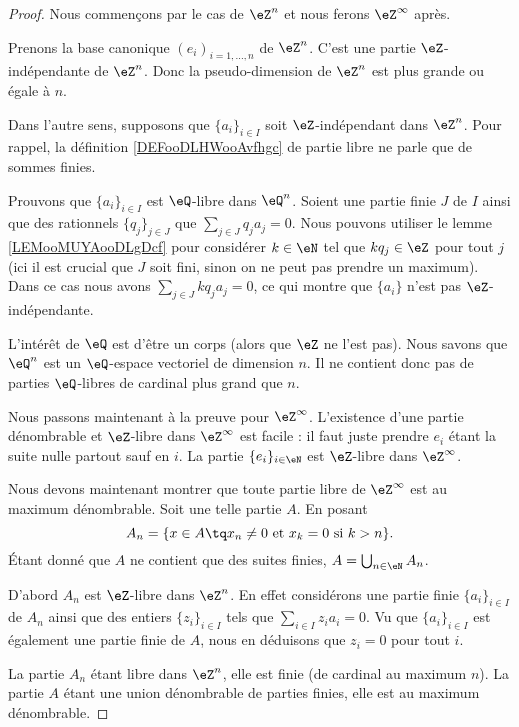 \begin{proof}
	Nous commençons par le cas de \( \eZ^n\) et nous ferons \( \eZ^{\infty}\) après.
	\begin{subproof}
		\spitem[\( \geq n\)]
		Prenons la base canonique \( (e_i)_{i=1,\ldots,n}\) de \( \eZ^n\). C'est une partie \( \eZ\)-indépendante de \( \eZ^n\). Donc la pseudo-dimension de \( \eZ^n\) est plus grande ou égale à \( n\).

		\spitem[\( \leq n\)]
		Dans l'autre sens, supposons que \( \{ a_i \}_{i\in I}\) soit \( \eZ\)-indépendant dans \( \eZ^n\). Pour rappel, la définition \ref{DEFooDLHWooAvfhgc} de partie libre ne parle que de sommes finies.

		Prouvons que \( \{ a_i \}_{i\in I} \) est \( \eQ\)-libre dans \( \eQ^n\). Soient une partie finie \( J\) de \( I\) ainsi que des rationnels \( \{ q_j \}_{j\in J}\) que \( \sum_{j\in J}q_ja_j=0\). Nous pouvons utiliser le lemme \ref{LEMooMUYAooDLgDcf} pour considérer \( k\in \eN\) tel que \( kq_j\in \eZ\) pour tout \( j\) (ici il est crucial que \( J\) soit fini, sinon on ne peut pas prendre un maximum). Dans ce cas nous avons \( \sum_{j\in J}kq_ja_j=0\), ce qui montre que \( \{ a_i \}\) n'est pas \( \eZ\)-indépendante.

		L'intérêt de \( \eQ\) est d'être un corps (alors que \( \eZ\) ne l'est pas). Nous savons que \( \eQ^n\) est un \( \eQ\)-espace vectoriel de dimension \( n\). Il ne contient donc pas de parties \( \eQ\)-libres de cardinal plus grand que \( n\).
	\end{subproof}

	Nous passons maintenant à la preuve pour \( \eZ^{\infty}\)\cite{MonCerveau}. L'existence d'une partie dénombrable et \( \eZ\)-libre dans \( \eZ^{\infty}\) est facile : il faut juste prendre \( e_i\) étant la suite nulle partout sauf en \( i\). La partie \( \{ e_i \}_{i\in \eN}\) est \( \eZ\)-libre dans \( \eZ^{\infty}\).

	Nous devons maintenant montrer que toute partie libre de \( \eZ^{\infty}\) est au maximum dénombrable. Soit une telle partie \( A\). En posant
	\begin{equation}
		A_n=\{ x\in A\tq x_n\neq 0\text{ et }x_k=0\text{ si }k>n \}.
	\end{equation}
	Étant donné que \( A\) ne contient que des suites finies, \( A=\bigcup_{n\in \eN}A_n\).

	D'abord \( A_n\) est \( \eZ\)-libre dans \( \eZ^n\). En effet considérons une partie finie \( \{ a_i \}_{i\in I}\) de \( A_n\) ainsi que des entiers \( \{ z_i \}_{i\in I}\) tels que \( \sum_{i\in I}z_ia_i=0\). Vu que \( \{ a_i \}_{i\in I}\) est également une partie finie de \( A\), nous en déduisons que \( z_i=0\) pour tout \( i\).

	La partie \( A_n\) étant libre dans \( \eZ^n\), elle est finie (de cardinal au maximum \( n\)). La partie \( A\) étant une union dénombrable de parties finies, elle est au maximum dénombrable.
\end{proof}

